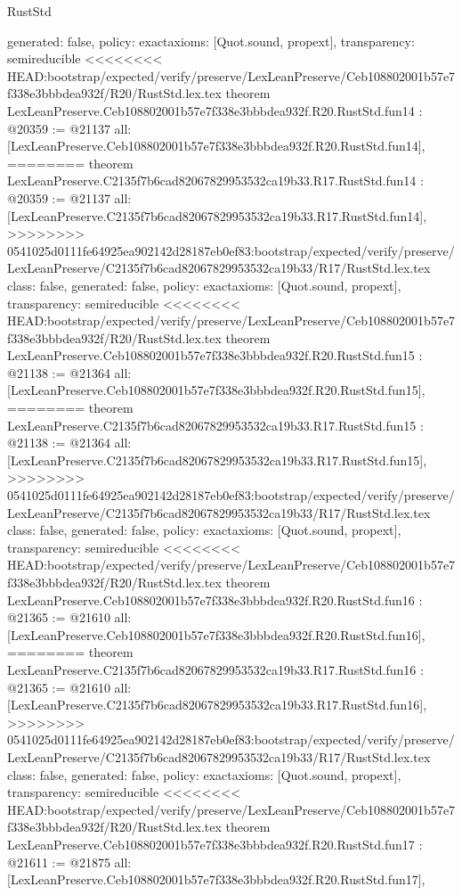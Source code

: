 \begin{lexlean}{RustStd}
\begin{coremodule}
{\begin{coremodule}
{{{{{{{{{{{{{{{{{  generated: false,
  policy: exact{axioms: [Quot.sound, propext]},
  transparency: semireducible
}
<<<<<<<< HEAD:bootstrap/expected/verify/preserve/LexLeanPreserve/Ceb108802001b57e7f338e3bbbdea932f/R20/RustStd.lex.tex
theorem LexLeanPreserve.Ceb108802001b57e7f338e3bbbdea932f.R20.RustStd.fun14 : @20359 := @21137 {
  all: [LexLeanPreserve.Ceb108802001b57e7f338e3bbbdea932f.R20.RustStd.fun14],
========
theorem LexLeanPreserve.C2135f7b6cad82067829953532ca19b33.R17.RustStd.fun14 : @20359 := @21137 {
  all: [LexLeanPreserve.C2135f7b6cad82067829953532ca19b33.R17.RustStd.fun14],
>>>>>>>> 0541025d0111fe64925ea902142d28187eb0ef83:bootstrap/expected/verify/preserve/LexLeanPreserve/C2135f7b6cad82067829953532ca19b33/R17/RustStd.lex.tex
  class: false,
  generated: false,
  policy: exact{axioms: [Quot.sound, propext]},
  transparency: semireducible
}
<<<<<<<< HEAD:bootstrap/expected/verify/preserve/LexLeanPreserve/Ceb108802001b57e7f338e3bbbdea932f/R20/RustStd.lex.tex
theorem LexLeanPreserve.Ceb108802001b57e7f338e3bbbdea932f.R20.RustStd.fun15 : @21138 := @21364 {
  all: [LexLeanPreserve.Ceb108802001b57e7f338e3bbbdea932f.R20.RustStd.fun15],
========
theorem LexLeanPreserve.C2135f7b6cad82067829953532ca19b33.R17.RustStd.fun15 : @21138 := @21364 {
  all: [LexLeanPreserve.C2135f7b6cad82067829953532ca19b33.R17.RustStd.fun15],
>>>>>>>> 0541025d0111fe64925ea902142d28187eb0ef83:bootstrap/expected/verify/preserve/LexLeanPreserve/C2135f7b6cad82067829953532ca19b33/R17/RustStd.lex.tex
  class: false,
  generated: false,
  policy: exact{axioms: [Quot.sound, propext]},
  transparency: semireducible
}
<<<<<<<< HEAD:bootstrap/expected/verify/preserve/LexLeanPreserve/Ceb108802001b57e7f338e3bbbdea932f/R20/RustStd.lex.tex
theorem LexLeanPreserve.Ceb108802001b57e7f338e3bbbdea932f.R20.RustStd.fun16 : @21365 := @21610 {
  all: [LexLeanPreserve.Ceb108802001b57e7f338e3bbbdea932f.R20.RustStd.fun16],
========
theorem LexLeanPreserve.C2135f7b6cad82067829953532ca19b33.R17.RustStd.fun16 : @21365 := @21610 {
  all: [LexLeanPreserve.C2135f7b6cad82067829953532ca19b33.R17.RustStd.fun16],
>>>>>>>> 0541025d0111fe64925ea902142d28187eb0ef83:bootstrap/expected/verify/preserve/LexLeanPreserve/C2135f7b6cad82067829953532ca19b33/R17/RustStd.lex.tex
  class: false,
  generated: false,
  policy: exact{axioms: [Quot.sound, propext]},
  transparency: semireducible
}
<<<<<<<< HEAD:bootstrap/expected/verify/preserve/LexLeanPreserve/Ceb108802001b57e7f338e3bbbdea932f/R20/RustStd.lex.tex
theorem LexLeanPreserve.Ceb108802001b57e7f338e3bbbdea932f.R20.RustStd.fun17 : @21611 := @21875 {
  all: [LexLeanPreserve.Ceb108802001b57e7f338e3bbbdea932f.R20.RustStd.fun17],
}}}}}}}}}}}}}}}}}}}}
\end{coremodule}}
\end{coremodule}
\end{lexlean}

